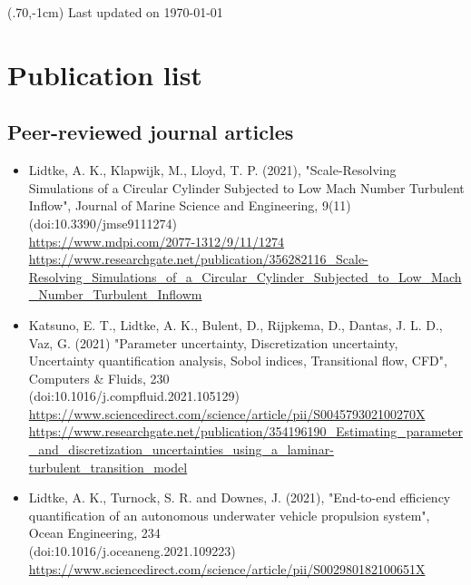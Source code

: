 \documentclass[a4paper,10pt]{article}
\begin{document}
\pagestyle{empty} %

\begin{textblock*}{100mm}(.70\textwidth,-1cm)
Last updated on \today
\end{textblock*}

\section{Publication list}

\subsection{Peer-reviewed journal articles}
%
\begin{itemize}
%
\item Lidtke, A. K., Klapwijk, M., Lloyd, T. P. (2021),
    "Scale-Resolving Simulations of a Circular Cylinder Subjected to Low Mach Number Turbulent Inflow",
    Journal of Marine Science and Engineering, 9(11)
    \cite{Lidtke2021b}
    \\ (doi:10.3390/jmse9111274)
    \\ \url{https://www.mdpi.com/2077-1312/9/11/1274}
    \\ \url{https://www.researchgate.net/publication/356282116_Scale-Resolving_Simulations_of_a_Circular_Cylinder_Subjected_to_Low_Mach_Number_Turbulent_Inflowm}
%
\item Katsuno, E. T., Lidtke, A. K., Bulent, D., Rijpkema, D., Dantas, J. L. D., Vaz, G. (2021)
    "Parameter uncertainty, Discretization uncertainty, Uncertainty quantification analysis, Sobol indices, Transitional flow, CFD",
    Computers \& Fluids, 230
    \cite{Katsuno2021}
    \\ (doi:10.1016/j.compfluid.2021.105129)
    \\ \url{https://www.sciencedirect.com/science/article/pii/S004579302100270X}
    \\ \url{https://www.researchgate.net/publication/354196190_Estimating_parameter_and_discretization_uncertainties_using_a_laminar-turbulent_transition_model}
%
\item Lidtke, A. K., Turnock, S. R. and Downes, J. (2021),
    "End-to-end efficiency quantification of an autonomous underwater vehicle propulsion system",
    Ocean Engineering, 234
    \cite{Lidtke2021a}
    \\ (doi:10.1016/j.oceaneng.2021.109223)
    \\ \url{https://www.sciencedirect.com/science/article/pii/S002980182100651X}

\end{itemize}
\end{document}
